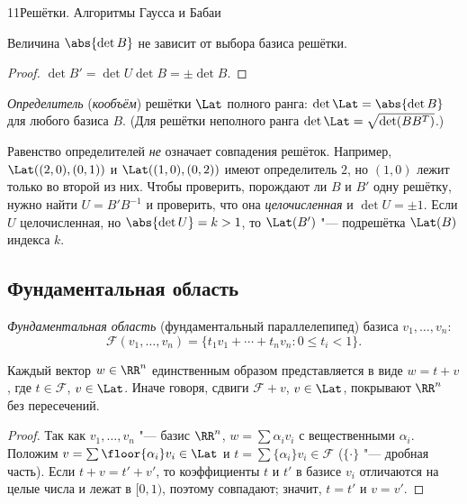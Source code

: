 \begin{lecture}{11}{Решётки. Алгоритмы Гаусса и Бабаи}
\begin{corollary}\label{l11:det-invariant}
Величина $\abs{\det B}$ не зависит от выбора базиса решётки.
\end{corollary}

\begin{proof}
$\det B' = \det U \det B = \pm \det B$.
\end{proof}

\begin{definition}
\emph{Определитель} (\emph{кообъём}) решётки $\Lat$ полного ранга: $\det \Lat = \abs{\det B}$
для любого базиса $B$. (Для решётки неполного ранга $\det \Lat = \sqrt{\det(BB^T)}$.)
\end{definition}

\begin{remark}
Равенство определителей \emph{не} означает совпадения решёток. Например, $\Lat((2, 0), (0, 1))$
и $\Lat((1, 0), (0, 2))$ имеют определитель $2$, но $(1, 0)$ лежит только во второй из них.
Чтобы проверить, порождают ли $B$ и $B'$ одну решётку, нужно найти $U = B' B^{-1}$ и проверить,
что она \emph{целочисленная} и $\det U = \pm 1$. Если $U$ целочисленная, но $\abs{\det U} = k > 1$,
то $\Lat(B')$ "--- подрешётка $\Lat(B)$ индекса $k$.
\end{remark}


\subsection{Фундаментальная область}

\begin{definition}
\emph{Фундаментальная область} (фундаментальный параллелепипед) базиса $v_1, \dots, v_n$:
\[
  \mathcal{F}(v_1, \dots, v_n) = \{t_1 v_1 + \cdots + t_n v_n : 0 \le t_i < 1\}.
\]
\end{definition}

\begin{proposition}\label{l11:tiling}
Каждый вектор $w \in \RR^n$ единственным образом представляется в виде $w = t + v$, где
$t \in \mathcal F$, $v \in \Lat$. Иначе говоря, сдвиги $\mathcal F + v$, $v \in \Lat$, покрывают
$\RR^n$ без пересечений.
\end{proposition}

\begin{proof}
Так как $v_1, \dots, v_n$ "--- базис $\RR^n$, $w = \sum \alpha_i v_i$ с вещественными $\alpha_i$.
Положим $v = \sum \floor{\alpha_i} v_i \in \Lat$ и $t = \sum \{\alpha_i\} v_i \in \mathcal F$
($\{\cdot\}$ "--- дробная часть). Если $t + v = t' + v'$, то коэффициенты $t$ и $t'$ в базисе $v_i$
отличаются на целые числа и лежат в $[0, 1)$, поэтому совпадают; значит, $t = t'$ и $v = v'$.
\end{proof}


\end{lecture}
